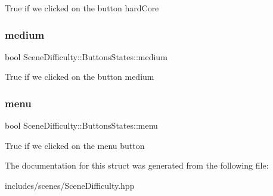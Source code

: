 True if we clicked on the button hard\+Core \mbox{\label{struct_scene_difficulty_1_1_buttons_states_a65a48af3d63e00b03e32802d7225394e}} 
\subsubsection{\texorpdfstring{medium}{medium}}
{\footnotesize\ttfamily bool Scene\+Difficulty\+::\+Buttons\+States\+::medium}

True if we clicked on the button medium \mbox{\label{struct_scene_difficulty_1_1_buttons_states_a407725512ff211f083177c2ea3e4c26f}} 
\subsubsection{\texorpdfstring{menu}{menu}}
{\footnotesize\ttfamily bool Scene\+Difficulty\+::\+Buttons\+States\+::menu}

True if we clicked on the menu button 

The documentation for this struct was generated from the following file\+:\begin{DoxyCompactItemize}
\item 
includes/scenes/Scene\+Difficulty.\+hpp\end{DoxyCompactItemize}
